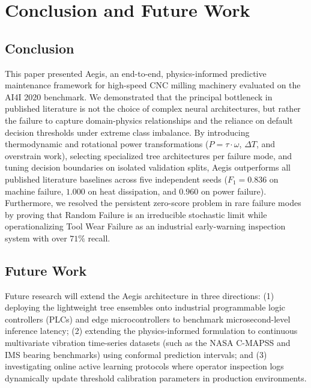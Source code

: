 \documentclass[conference]{IEEEtran}
\begin{document}
\section{Conclusion and Future Work}

\subsection{Conclusion}
This paper presented Aegis, an end-to-end, physics-informed predictive maintenance framework for high-speed CNC milling machinery evaluated on the AI4I 2020 benchmark. We demonstrated that the principal bottleneck in published literature is not the choice of complex neural architectures, but rather the failure to capture domain-physics relationships and the reliance on default decision thresholds under extreme class imbalance. By introducing thermodynamic and rotational power transformations ($P = \tau \cdot \omega$, $\Delta T$, and overstrain work), selecting specialized tree architectures per failure mode, and tuning decision boundaries on isolated validation splits, Aegis outperforms all published literature baselines across five independent seeds ($F_1 = 0.836$ on machine failure, $1.000$ on heat dissipation, and $0.960$ on power failure). Furthermore, we resolved the persistent zero-score problem in rare failure modes by proving that Random Failure is an irreducible stochastic limit while operationalizing Tool Wear Failure as an industrial early-warning inspection system with over $71\%$ recall.

\subsection{Future Work}
Future research will extend the Aegis architecture in three directions: (1) deploying the lightweight tree ensembles onto industrial programmable logic controllers (PLCs) and edge microcontrollers to benchmark microsecond-level inference latency; (2) extending the physics-informed formulation to continuous multivariate vibration time-series datasets (such as the NASA C-MAPSS and IMS bearing benchmarks) using conformal prediction intervals; and (3) investigating online active learning protocols where operator inspection logs dynamically update threshold calibration parameters in production environments.
\end{document}
